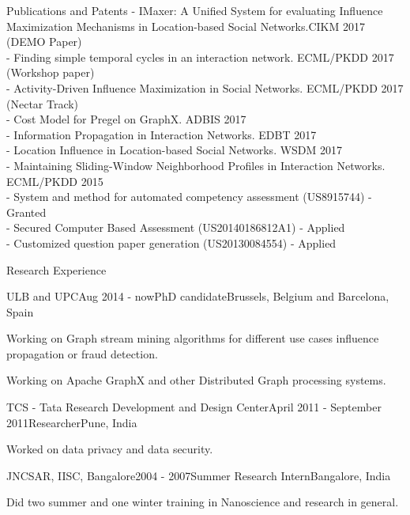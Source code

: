 \documentclass{resume} %
\begin{document}
\begin{rSection}{Publications and Patents}
- IMaxer: A Unified System for evaluating Influence Maximization Mechanisms in Location-based Social Networks.CIKM 2017 (DEMO Paper)\\
- Finding simple temporal cycles in an interaction network. ECML/PKDD 2017 (Workshop paper)\\
- Activity-Driven Influence Maximization in Social Networks. ECML/PKDD 2017 (Nectar Track)\\
- Cost Model for Pregel on GraphX. ADBIS 2017\\
- Information Propagation in Interaction Networks. EDBT 2017\\
- Location Influence in Location-based Social Networks. WSDM 2017\\
- Maintaining Sliding-Window Neighborhood Profiles in Interaction Networks. ECML/PKDD 2015\\
- System and method for automated competency assessment (US8915744) - Granted\\ %
- Secured Computer Based Assessment (US20140186812A1) - Applied\\ %
- Customized question paper generation (US20130084554) - Applied %
\end{rSection}
\iffalse

\begin{rSection}{Research Experience}
\begin{rSubsection}{ULB and UPC}{Aug 2014 - now}{PhD candidate}{Brussels, Belgium and Barcelona, Spain}
\item Working on Graph stream mining algorithms for different use cases influence propagation or fraud detection.
\item Working on Apache GraphX and other Distributed Graph processing systems.
\end{rSubsection}
\begin{rSubsection}{TCS - Tata Research Development and Design Center}{April 2011 - September 2011}{Researcher}{Pune, India}
\item Worked on data privacy and data security.
\end{rSubsection}

\begin{rSubsection}{JNCSAR, IISC, Bangalore}{2004 - 2007}{Summer Research Intern}{Bangalore, India}
\item Did two summer and one winter training in Nanoscience and research in general.
\end{rSubsection}
\end{rSection}
\end{document}

